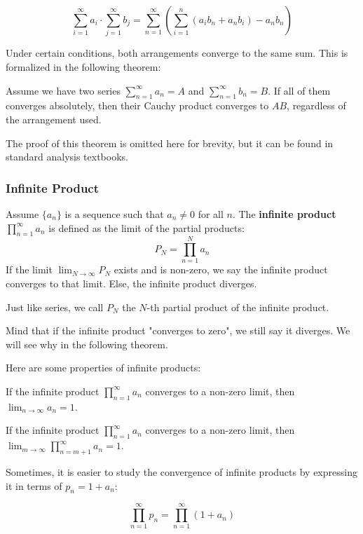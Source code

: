 \[
\sum_{i=1}^{\infty} a_i \cdot \sum_{j=1}^{\infty} b_j = \sum_{n=1}^{\infty} \left(\sum_{i=1}^{n}(a_i b_n+ a_n b_i) - a_n b_n \right)
\]

Under certain conditions, both arrangements converge to the same sum. This is formalized in the following theorem:

\begin{theorem}
    Assume we have two series $\sum_{n=1}^{\infty} a_n = A$ and $\sum_{n=1}^{\infty} b_n = B$. If all of them converges absolutely, then their Cauchy product converges to $AB$, regardless of the arrangement used.
\end{theorem}

The proof of this theorem is omitted here for brevity, but it can be found in standard analysis textbooks.

\subsubsection{Infinite Product}
\begin{definition}
    Assume $\{a_n\}$ is a sequence such that $a_n \neq 0$ for all $n$. The \textbf{infinite product} $\prod_{n=1}^{\infty} a_n$ is defined as the limit of the partial products:
    \[ P_N = \prod_{n=1}^{N} a_n \]
    If the limit $\lim_{N \to \infty} P_N$ exists and is non-zero, we say the infinite product converges to that limit.
    Else, the infinite product diverges.
\end{definition}

Just like series, we call $P_N$ the $N$-th partial product of the infinite product.

Mind that if the infinite product "converges to zero", we still say it diverges. We will see why in the following theorem.

Here are some properties of infinite products:

\begin{theorem}
    If the infinite product $\prod_{n=1}^{\infty} a_n$ converges to a non-zero limit, then $\lim_{n \to \infty} a_n = 1$.
    
    If the infinite product $\prod_{n=1}^{\infty} a_n$ converges to a non-zero limit, then $\lim_{m \to \infty} \prod_{n=m+1}^{\infty} a_n = 1$.
\end{theorem}

Sometimes, it is easier to study the convergence of infinite products by expressing it in terms of $p_n = 1 + a_n$:

\[
\prod_{n=1}^{\infty} p_n = \prod_{n=1}^{\infty} (1 + a_n)
\]

